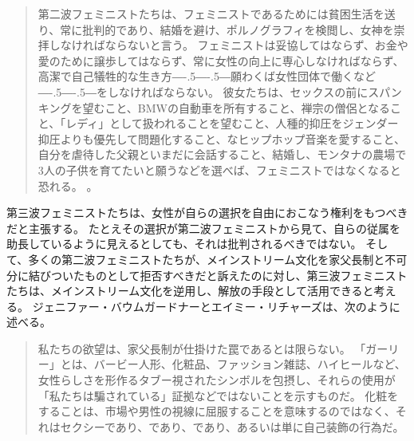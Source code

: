\documentclass[paper=a4,book,openany]{jlreq}
\def\DDASH{―\kern-.5\zw―\kern-.5\zw―} %
\begin{document}
\begin{quote}
  第二波フェミニストたちは、フェミニストであるためには貧困生活を送り、常に批判的であり、結婚を避け、ポルノグラフィを検閲し、女神を崇拝しなければならないと言う。
フェミニストは妥協してはならず、お金や愛のために譲歩してはならず、常に女性の向上に専心しなければならず、高潔で自己犠牲的な生き方{\DDASH}願わくば女性団体で働くなど{\DDASH}をしなければならない。
彼女たちは、セックスの前にスパンキングを望むこと、BMWの自動車を所有すること、禅宗の僧侶となること、「レディ」として扱われることを望むこと、人種的抑圧をジェンダー抑圧よりも優先して問題化すること、なヒップホップ音楽を愛すること、自分を虐待した父親といまだに会話すること、結婚し、モンタナの農場で3人の子供を育てたいと願うなどを選べば、フェミニストではなくなると恐れる。
\citep[p.xxxii]{walker95:_to_be_real}。
\end{quote}

第三波フェミニストたちは、女性が自らの選択を自由におこなう権利をもつべきだと主張する。
たとえその選択が第二波フェミニストから見て、自らの従属を助長しているように見えるとしても、それは批判されるべきではない。
そして、多くの第二波フェミニストたちが、メインストリーム文化を家父長制と不可分に結びついたものとして拒否すべきだと訴えたのに対し、第三波フェミニストたちは、メインストリーム文化を逆用し、解放の手段として活用できると考える。
ジェニファー・バウムガードナーとエイミー・リチャーズは、次のように述べる。

\begin{quote}
  私たちの欲望は、家父長制が仕掛けた罠であるとは限らない。
「ガーリー」とは、バービー人形、化粧品、ファッション雑誌、ハイヒールなど、女性らしさを形作るタブー視されたシンボルを包摂し、それらの使用が「私たちは騙されている」証拠などではないことを示すものだ。
化粧をすることは、市場や男性の視線に屈服することを意味するのではなく、それはセクシーであり、であり、であり、あるいは単に自己装飾の行為だ。
\citep[pp.302--303]{baumgardner06:_manif}

\end{quote}
\end{document}
